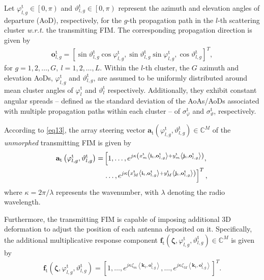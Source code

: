 \documentclass[lettersize,journal]{IEEEtran}
\begin{document}
Let $\varphi _{l,g}^{\textrm{t}}\in \left [ 0,\pi \right )$ and $\vartheta _{l,g}^{\textrm{t}}\in \left [ 0,\pi \right )$ represent the azimuth and elevation angles of departure (AoD), respectively, for the $g$-th propagation path in the $l$-th scattering cluster \emph{w.r.t.} the transmitting FIM. The corresponding propagation direction is given by
\begin{align}\label{eq13}
 \mathbf{o}_{l,g}^{\textrm{t}} = \left [ \sin\vartheta_{l,g}^{\textrm{t}} \cos\varphi_{l,g}^{\textrm{t}} , \sin\vartheta_{l,g}^{\textrm{t}} \sin\varphi_{l,g}^{\textrm{t}} , \cos\vartheta_{l,g}^{\textrm{t}} \right ] ^{T},
\end{align}
for $g = 1, 2, \ldots, G,\ l = 1, 2, \ldots, L$. Within the $l$-th cluster, the $G$ azimuth and elevation AoDs, $\varphi_{l,g}^{\textrm{t}}$ and $\vartheta_{l,g}^{\textrm{t}}$, are assumed to be uniformly distributed around mean cluster angles of $\varphi_{l}^{\textrm{t}}$ and $\vartheta_{l}^{\textrm{t}}$ respectively. Additionally, they exhibit constant angular spreads -- defined as the standard deviation of the AoAs/AoDs associated with multiple propagation paths within each cluster \cite{TWC_2014_Ayach_Spatially} -- of $\sigma_{\varphi}^{\textrm{t}}$ and $\sigma_{\vartheta}^{\textrm{t}}$, respectively.


According to \eqref{eq13}, the array steering vector $\mathbf{a}_{\textrm{t}} \left ( \varphi_{l,g}^{\textrm{t}} ,\vartheta_{l,g}^{\textrm{t}} \right ) \in \mathbb{C}^{M}$ of the \emph{unmorphed} transmitting FIM is given by
\begin{align}\label{eq14}
 \mathbf{a}_{\textrm{t}}\left ( \varphi_{l,g}^{\textrm{t}}, \vartheta_{l,g}^{\textrm{t}} \right )=&\left [ 1,\ldots , e^{j\kappa \left ( x_{m}^{\textrm{t}}\left \langle \mathbf{i}_{\textrm{t}},\mathbf{o}_{l,g}^{\textrm{t}}\right \rangle+y_{m}^{\textrm{t}}\left \langle \mathbf{j}_{\textrm{t}},\mathbf{o}_{l,g}^{\textrm{t}} \right \rangle \right )}, \right.\notag\\
&\left. \ldots ,e^{j\kappa \left ( x_{M}^{\textrm{t}}\left \langle \mathbf{i}_{\textrm{t}},\mathbf{o}_{l,g}^{\textrm{t}}\right \rangle+y_{M}^{\textrm{t}}\left \langle \mathbf{j}_{\textrm{t}},\mathbf{o}_{l,g}^{\textrm{t}} \right \rangle \right )} \right ]^{T},
\end{align}
where $\kappa = 2\pi / \lambda $ represents the wavenumber, with $\lambda $ denoting the radio wavelength.


Furthermore, the transmitting FIM is capable of imposing additional 3D deformation to adjust the position of each antenna deposited on it. Specifically, the additional multiplicative response component $\mathbf{f}_{\textrm{t}} \left ( \boldsymbol{\zeta}, \varphi_{l,g}^{\textrm{t}} ,\vartheta_{l,g}^{\textrm{t}} \right ) \in \mathbb{C}^{M}$ is given by
\begin{align}\label{eq15}
 \mathbf{f}_{\textrm{t}}\left ( \boldsymbol{\zeta}, \varphi_{l,g}^{\textrm{t}}, \vartheta_{l,g}^{\textrm{t}} \right )=\left [ 1,\ldots , e^{j\kappa \zeta_{m}\left \langle \mathbf{k}_{\textrm{t}},\mathbf{o}_{l,g}^{\textrm{t}} \right \rangle }, \ldots ,e^{j\kappa \zeta_{M}\left \langle \mathbf{k}_{\textrm{t}},\mathbf{o}_{l,g}^{\textrm{t}} \right \rangle } \right ]^{T}.
\end{align}
\end{document}
